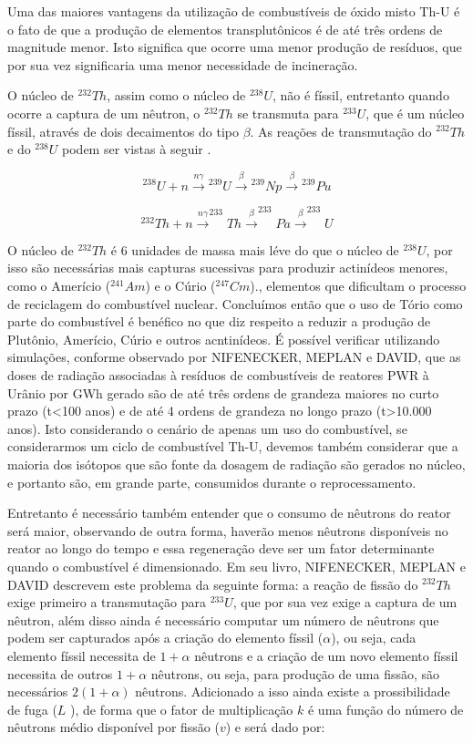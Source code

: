 \documentclass[
	12pt,				%
	openany,			%
	twoside,			%
	a4paper,			%
	english,			%
	french,				%
	spanish,			%
	brazil				%
	]{abntex2}
\begin{document}
Uma das maiores vantagens da utilização de combustíveis de óxido misto Th-U é o fato de que a produção de elementos transplutônicos é de até três ordens de magnitude menor. Isto significa que ocorre uma menor produção de resíduos, que por sua vez significaria uma menor necessidade de incineração\cite{9moreira}.

O núcleo de $^{232}Th$, assim como o núcleo de $^{238}U$, não é físsil, entretanto quando ocorre a captura de um nêutron, o $^{232}Th$ se transmuta para $^{233}U$, que é um núcleo físsil, através de dois decaimentos do tipo $\beta$. As reações de transmutação do $^{232}Th$ e do $^{238}U$ podem ser vistas à seguir .

\[
^{238}U+n\xrightarrow{n\gamma}{}^{239}U\xrightarrow{\beta}{}^{239}Np\xrightarrow	{\beta}{}^{239}Pu
\]

\[
^{232}Th+n\xrightarrow{n\gamma}^{233}Th\xrightarrow{\beta}^{233}Pa\xrightarrow{\beta}^{233}U
\]

O núcleo de $^{232}Th$ é 6 unidades de massa mais léve do que o núcleo de $^{238}U$, por isso são necessárias mais capturas sucessivas para produzir actinídeos menores, como o Amerício ($^{241}Am$) e o Cúrio ($^{247}Cm$)., elementos que dificultam o processo de reciclagem do combustível nuclear. Concluímos então que o uso de Tório como parte do combustível é benéfico no que diz respeito a reduzir a produção de Plutônio, Amerício, Cúrio e outros acntinídeos. É possível verificar utilizando simulações, conforme observado por NIFENECKER, MEPLAN e DAVID, que as doses de radiação associadas à resíduos de combustíveis de reatores PWR à Urânio por GWh gerado são de até três ordens de grandeza maiores no curto prazo (t<100 anos) e de até 4 ordens de
grandeza no longo prazo (t>10.000 anos). Isto considerando o cenário de apenas um uso do combustível, se considerarmos um ciclo de combustível Th-U, devemos também considerar que a maioria dos isótopos que são fonte da dosagem de radiação são gerados no núcleo, e portanto são, em grande parte, consumidos durante o reprocessamento\cite{21NIFNECKER}.

Entretanto é necessário também entender que o consumo de nêutrons do reator será maior, observando de outra forma, haverão menos nêutrons disponíveis no reator ao longo do tempo e essa regeneração deve ser um fator determinante quando o combustível é dimensionado. Em seu livro, NIFENECKER, MEPLAN e DAVID descrevem este problema da seguinte forma: a reação de fissão do $^{232}Th$ exige primeiro a transmutação para $^{233}U$, que por sua vez exige a captura de um nêutron, além disso ainda é necessário computar um número de nêutrons que podem ser capturados após a criação do elemento físsil ($\alpha$), ou seja, cada elemento
físsil necessita de $1+\alpha$ nêutrons e a criação de um novo elemento físsil necessita de outros $1+\alpha$ nêutrons, ou seja, para produção de uma fissão, são necessários $2(1+\alpha)$ nêutrons. Adicionado a isso ainda existe a prossibilidade de fuga ($L$ ), de forma que o fator de multiplicação $k$ é uma função do número de nêutrons médio disponível por fissão ($v$) e será dado por:
\end{document}

